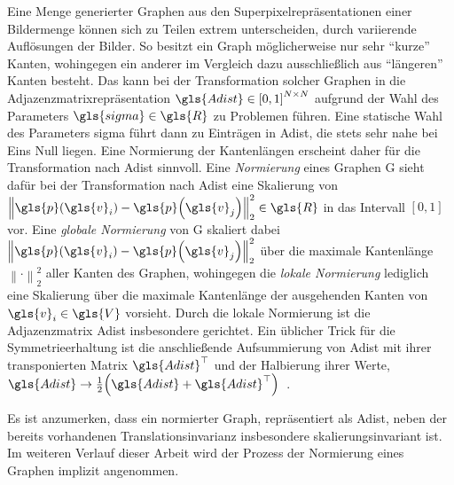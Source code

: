 Eine Menge generierter Graphen aus den Superpixelrepräsentationen einer Bildermenge können sich zu Teilen extrem unterscheiden, \bspw{} durch variierende Auflösungen der Bilder.
So besitzt ein Graph möglicherweise nur sehr \enquote{kurze} Kanten, wohingegen ein anderer im Vergleich dazu ausschließlich aus \enquote{längeren} Kanten besteht.
Das kann bei der Transformation solcher Graphen in die Adjazenzmatrixrepräsentation $\gls{Adist} \in {\left[0, 1\right]}^{N \times N}$ aufgrund der Wahl des Parameters $\gls{sigma} \in \gls{R}$ zu Problemen führen.
Eine statische Wahl des Parameters \gls{sigma} führt dann \ggf{} zu Einträgen in \gls{Adist}, die stets sehr nahe bei Eins \bzw{} Null liegen.
Eine Normierung der Kantenlängen erscheint daher für die Transformation nach \gls{Adist} sinnvoll.
Eine \emph{Normierung} eines Graphen \gls{G} sieht dafür bei der Transformation nach \gls{Adist} eine Skalierung von ${\left\|\gls{p}\left(\gls{v}_i\right) - \gls{p}\left(\gls{v}_j\right)\right\|}_2^2 \in \gls{R}$ in das Intervall $\left[0, 1\right]$ vor.
Eine \emph{globale Normierung} von \gls{G} skaliert dabei ${\left\|\gls{p}\left(\gls{v}_i\right) - \gls{p}\left(\gls{v}_j\right)\right\|}_2^2$ über die maximale Kantenlänge ${\left\|\cdot\right\|}_2^2$ aller Kanten des Graphen, wohingegen die \emph{lokale Normierung} lediglich eine Skalierung über die maximale Kantenlänge der ausgehenden Kanten von $\gls{v}_i \in \gls{V}$ vorsieht.
Durch die lokale Normierung ist die Adjazenzmatrix \gls{Adist} insbesondere gerichtet.
Ein üblicher Trick für die Symmetrieerhaltung ist die anschließende Aufsummierung von \gls{Adist} mit ihrer transponierten Matrix $\gls{Adist}^{\top}$ und der Halbierung ihrer Werte, \dhe{} $\gls{Adist} \rightarrow \frac{1}{2}\left(\gls{Adist} + \gls{Adist}^{\top}\right)$~\cite{Reuter}.

Es ist anzumerken, dass ein normierter Graph, repräsentiert als \gls{Adist}, neben der bereits vorhandenen Translationsinvarianz insbesondere skalierungsinvariant ist.
Im weiteren Verlauf dieser Arbeit wird der Prozess der Normierung eines Graphen implizit angenommen.
